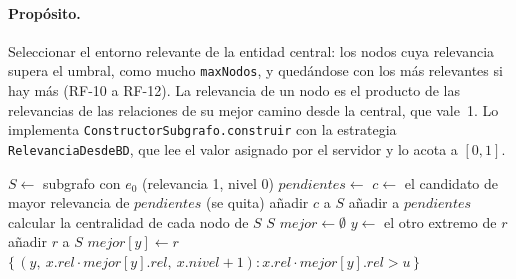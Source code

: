 \paragraph{Propósito.} Seleccionar el entorno relevante de la entidad central: los nodos cuya relevancia supera el umbral, como mucho \texttt{maxNodos}, y quedándose con los más relevantes si hay más (RF-10 a RF-12). La relevancia de un nodo es el producto de las relevancias de las relaciones de su mejor camino desde la central, que vale~1. Lo implementa \texttt{ConstructorSubgrafo.construir} con la estrategia \texttt{RelevanciaDesdeBD}, que lee el valor asignado por el servidor y lo acota a $[0,1]$.

\begin{algorithm}[htbp]
  \caption{Construcción del subgrafo (\texttt{ConstructorSubgrafo.construir}).}
  \label{alg:subgrafo}
  \begin{algorithmic}[1]
      \State $S \gets$ subgrafo con $e_0$ (relevancia 1, nivel 0)
      \State $pendientes \gets$ 
        \State $c \gets$ el candidato de mayor relevancia de $pendientes$ (se quita)
         
          \State añadir $c$ a $S$
          \State añadir  a $pendientes$
        \EndIf
      \EndWhile
      \State calcular la centralidad de cada nodo de $S$ 
      \State \Return $S$
    \EndFunction
    \Statex
      \State $mejor \gets \emptyset$ 
        \State $y \gets$ el otro extremo de $r$
         \State añadir $r$ a $S$ 
         \State $mejor[y] \gets r$
        \EndIf
      \EndFor
      \State \Return $\{\, (y,\ x.rel \cdot mejor[y].rel,\ x.nivel+1) : x.rel \cdot mejor[y].rel > u \,\}$
    \EndFunction
  \end{algorithmic}
\end{algorithm}

